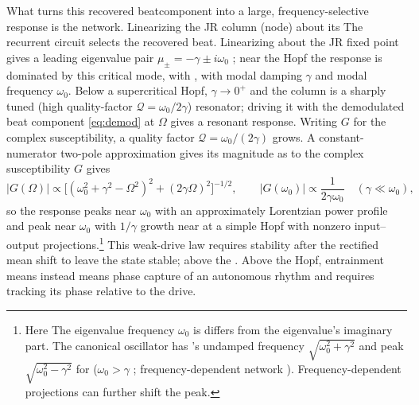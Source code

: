 \documentclass[11pt,a4paper]{article}
\providecommand{\DIFaddtex}[1]{{\protect\color{blue} \sf #1}} %
\providecommand{\DIFdeltex}[1]{{\protect\color{red} \scriptsize #1}} %
\providecommand{\DIFaddbegin}{} %
\providecommand{\DIFaddend}{} %
\providecommand{\DIFdelbegin}{} %
\providecommand{\DIFdelend}{} %
\providecommand{\DIFadd}[1]{\texorpdfstring{\DIFaddtex{#1}}{#1}} %
\providecommand{\DIFdel}[1]{\texorpdfstring{\DIFdeltex{#1}}{}} %
\begin{document}
\DIFdelbegin \DIFdel{What turns this recovered beatcomponent into a large, frequency-selective response is
the network. Linearizing the JR column (node) about its }\DIFdelend \DIFaddbegin \DIFadd{The recurrent circuit selects the recovered beat. Linearizing about the JR
}\DIFaddend fixed point gives a leading \DIFdelbegin \DIFdel{eigenvalue }\DIFdelend pair $\mu_\pm=-\gamma\pm i\omega_0$\DIFdelbegin \DIFdel{; near the Hopf the response is dominated by this critical
mode, with
}\DIFdelend \DIFaddbegin \DIFadd{, with
modal }\DIFaddend damping $\gamma$ and \DIFdelbegin \DIFdel{modal }\DIFdelend frequency $\omega_0$. Below a supercritical
Hopf, $\gamma\to0^+$ and the \DIFdelbegin \DIFdel{column is a sharply tuned (high quality-factor $\mathcal{Q}=\omega_0/2\gamma$) resonator;
driving it with the demodulated beat component
\eqref{eq:demod} at $\Omega$ gives a resonant response. Writing $G$ for the complex susceptibility, a }\DIFdelend \DIFaddbegin \DIFadd{quality factor
$\mathcal Q=\omega_0/(2\gamma)$ grows. A }\DIFaddend constant-numerator two-pole
approximation \DIFdelbegin \DIFdel{gives its magnitude as
}\DIFdelend \DIFaddbegin \DIFadd{to the complex susceptibility $G$ gives
}\DIFaddend \begin{equation}
|G(\Omega)|\propto\big[(\omega_0^2+\gamma^2-\Omega^2)^2+(2\gamma\Omega)^2\big]^{-1/2},
\qquad |G(\omega_0)|\propto\frac{1}{2\gamma\omega_0}
\quad(\gamma\ll\omega_0),
\label{eq:gain}
\end{equation}
\DIFdelbegin \DIFdel{so the response peaks near $\omega_0$ with }\DIFdelend an approximately Lorentzian power \DIFdelbegin \DIFdel{profile and }\DIFdelend \DIFaddbegin \DIFadd{peak near $\omega_0$ with }\DIFaddend $1/\gamma$
growth \DIFdelbegin \DIFdel{near }\DIFdelend \DIFaddbegin \DIFadd{at }\DIFaddend a simple Hopf with nonzero input--output projections.\footnote{\DIFdelbegin \DIFdel{Here }\DIFdelend
\DIFaddbegin \DIFadd{The eigenvalue frequency }\DIFaddend $\omega_0$ \DIFdelbegin \DIFdel{is }\DIFdelend \DIFaddbegin \DIFadd{differs from }\DIFaddend the \DIFdelbegin \DIFdel{eigenvalue's imaginary part. The
}\DIFdelend canonical oscillator\DIFdelbegin \DIFdel{has }\DIFdelend \DIFaddbegin \DIFadd{'s
}\DIFaddend undamped frequency $\sqrt{\omega_0^2+\gamma^2}$ and peak
$\sqrt{\omega_0^2-\gamma^2}$ \DIFdelbegin \DIFdel{for }\DIFdelend \DIFaddbegin \DIFadd{(}\DIFaddend $\omega_0>\gamma$\DIFdelbegin \DIFdel{; frequency-dependent
network }\DIFdelend \DIFaddbegin \DIFadd{).
Frequency-dependent }\DIFaddend projections can \DIFaddbegin \DIFadd{further }\DIFaddend shift the peak.}
This weak-drive law requires \DIFaddbegin \DIFadd{stability after }\DIFaddend the rectified mean shift\DIFdelbegin \DIFdel{to leave the state stable;
above the }\DIFdelend \DIFaddbegin \DIFadd{.
Above the }\DIFaddend Hopf, entrainment \DIFdelbegin \DIFdel{means }\DIFdelend \DIFaddbegin \DIFadd{instead means phase }\DIFaddend capture of an autonomous rhythm\DIFdelbegin \DIFdel{and
requires tracking its phase relative to the drive}\DIFdelend .
\end{document}
